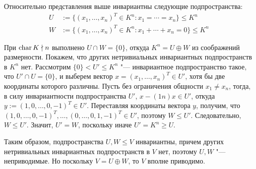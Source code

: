 \begin{solution}
	Относительно представления выше инвариантны следующие подпространства:
	\begin{align*}
		U &:= \{(x_1, \dotsc, x_n)^T \in K^n : x_1 = \dotsb = x_n\} \le K^n
		\\
		W &:= \{(x_1, \dotsc, x_n)^T \in K^n : x_1 + \dotsb + x_n = 0\} \le K^n
	\end{align*}
	
	При $\operatorname{char}{K} \nmid n$ выполнено $U \cap W = \{0\}$, откуда $K^n = U \oplus W$ из соображений размерности. Покажем, что других нетривиальных инвариантных подпространств в $K^n$ нет. Рассмотрим $\{0\} < U' \le K^n$ "--- инвариантное подпространство такое, что $U' \cap U = \{0\}$, и выберем вектор $x = (x_1, \dotsc, x_n)^T \in U'$, хотя бы две координаты которого различны. Пусть без ограничения общности $x_1 \ne x_n$, тогда, в силу инвариантности подпространства $U'$, $x - (1n)x \in U'$, откуда $y := (1, 0, \dotsc, 0, -1)^T \in U'$. Переставляя координаты вектора $y$, получим, что $(1, 0, \dotsc, 0, -1)^T, \dotsc, (0, \dotsc, 0, 1, -1)^T \in U'$, поэтому $W \le U'$. Следовательно, $W \le U'$. Значит, $U' = W$, поскольку иначе $U' = K^n \ge U$.
	
	Таким образом, подпространства $U, W \le V$ инвариантны, причем других нетривиальных инвариантных подпространств в $V$ нет, поэтому $U, W$ "--- неприводимые. Но поскольку $V = U \oplus W$, то $V$ вполне приводимо.
\end{solution}